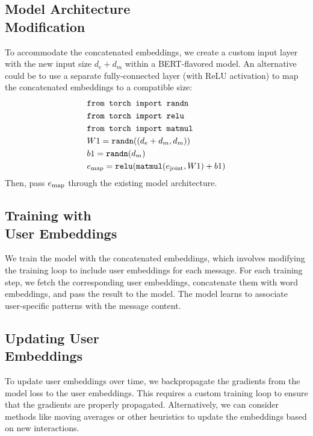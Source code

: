 \documentclass{article}
\begin{document}
\begin{itemize}
\subsection[Model Architecture Modification]{Model Architecture\\ Modification}
To accommodate the concatenated embeddings, we create a custom input layer with the new input size $d_e + d_m$ within a BERT-flavored model. An alternative could be to use a separate fully-connected layer (with ReLU activation) to map the concatenated embeddings to a compatible size:
\begin{equation}
\begin{aligned}
&\text{\texttt{from torch import randn}} \\
&\text{\texttt{from torch import relu}} \\
&\text{\texttt{from torch import matmul}} \\
&W1 = \text{\texttt{randn}}((d_e + d_m, d_m)) \\
&b1 = \text{\texttt{randn}}(d_m) \\
&e_\textnormal{map} = \text{\texttt{relu}}(\text{\texttt{matmul}}(e_\textnormal{joint}, W1) + b1)
\end{aligned}
\end{equation}
Then, pass $e_\textnormal{map}$ through the existing model architecture.

\subsection[Training with User Embeddings]{Training with\\ User Embeddings}
We train the model with the concatenated embeddings, which involves modifying the training loop to include user embeddings for each message. For each training step, we fetch the corresponding user embeddings, concatenate them with word embeddings, and pass the result to the model. The model learns to associate user-specific patterns with the message content.

\subsection[Updating User Embeddings]{Updating User\\ Embeddings}
To update user embeddings over time, we backpropagate the gradients from the model loss to the user embeddings. This requires a custom training loop to ensure that the gradients are properly propagated. Alternatively, we can consider methods like moving averages or other heuristics to update the embeddings based on new interactions.


\end{itemize}
\end{document}

